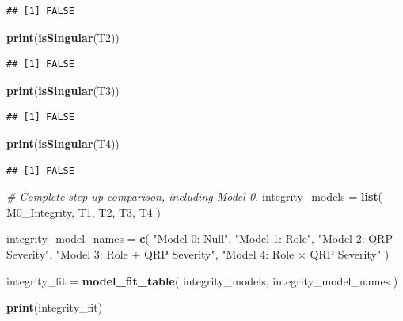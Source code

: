 \documentclass[
]{article}
\newenvironment{Shaded}{\begin{snugshade}}{\end{snugshade}}
\newcommand{\CommentTok}[1]{\textcolor[rgb]{0.56,0.35,0.01}{\textit{#1}}}
\newcommand{\FunctionTok}[1]{\textcolor[rgb]{0.13,0.29,0.53}{\textbf{#1}}}
\newcommand{\NormalTok}[1]{#1}
\newcommand{\OtherTok}[1]{\textcolor[rgb]{0.56,0.35,0.01}{#1}}
\newcommand{\StringTok}[1]{\textcolor[rgb]{0.31,0.60,0.02}{#1}}
\begin{document}
\begin{verbatim}
## [1] FALSE
\end{verbatim}

\begin{Shaded}
\begin{Highlighting}[]
\FunctionTok{print}\NormalTok{(}\FunctionTok{isSingular}\NormalTok{(T2))}
\end{Highlighting}
\end{Shaded}

\begin{verbatim}
## [1] FALSE
\end{verbatim}

\begin{Shaded}
\begin{Highlighting}[]
\FunctionTok{print}\NormalTok{(}\FunctionTok{isSingular}\NormalTok{(T3))}
\end{Highlighting}
\end{Shaded}

\begin{verbatim}
## [1] FALSE
\end{verbatim}

\begin{Shaded}
\begin{Highlighting}[]
\FunctionTok{print}\NormalTok{(}\FunctionTok{isSingular}\NormalTok{(T4))}
\end{Highlighting}
\end{Shaded}

\begin{verbatim}
## [1] FALSE
\end{verbatim}

\begin{Shaded}
\begin{Highlighting}[]
\CommentTok{\# Complete step{-}up comparison, including Model 0.}
\NormalTok{integrity\_models }\OtherTok{=} \FunctionTok{list}\NormalTok{(}
\NormalTok{  M0\_Integrity,}
\NormalTok{  T1,}
\NormalTok{  T2,}
\NormalTok{  T3,}
\NormalTok{  T4}
\NormalTok{)}

\NormalTok{integrity\_model\_names }\OtherTok{=} \FunctionTok{c}\NormalTok{(}
  \StringTok{"Model 0: Null"}\NormalTok{,}
  \StringTok{"Model 1: Role"}\NormalTok{,}
  \StringTok{"Model 2: QRP Severity"}\NormalTok{,}
  \StringTok{"Model 3: Role + QRP Severity"}\NormalTok{,}
  \StringTok{"Model 4: Role × QRP Severity"}
\NormalTok{)}

\NormalTok{integrity\_fit }\OtherTok{=} \FunctionTok{model\_fit\_table}\NormalTok{(}
\NormalTok{  integrity\_models,}
\NormalTok{  integrity\_model\_names}
\NormalTok{)}

\FunctionTok{print}\NormalTok{(integrity\_fit)}
\end{Highlighting}
\end{Shaded}
\end{document}
